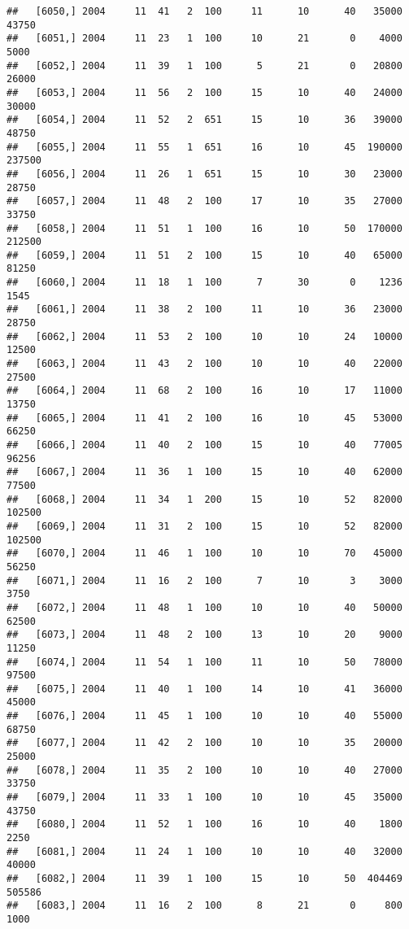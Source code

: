 \documentclass{article}\usepackage[]{graphicx}\usepackage[]{color}
\makeatletter
\newenvironment{kframe}{%
 \def\at@end@of@kframe{}%
 \ifinner\ifhmode%
  \def\at@end@of@kframe{\end{minipage}}%
  \begin{minipage}{\columnwidth}%
 \fi\fi%
 \def\FrameCommand##1{\hskip\@totalleftmargin \hskip-\fboxsep
 \colorbox{shadecolor}{##1}\hskip-\fboxsep
     \hskip-\linewidth \hskip-\@totalleftmargin \hskip\columnwidth}%
 \MakeFramed {\advance\hsize-\width
   \@totalleftmargin\z@ \linewidth\hsize
   \@setminipage}}%
 {\par\unskip\endMakeFramed%
 \at@end@of@kframe}
\newenvironment{knitrout}{}{} %
\makeatother
\begin{document}
\begin{knitrout}
\begin{kframe}
\begin{verbatim}
##   [6050,] 2004     11  41   2  100     11      10      40   35000   43750
##   [6051,] 2004     11  23   1  100     10      21       0    4000    5000
##   [6052,] 2004     11  39   1  100      5      21       0   20800   26000
##   [6053,] 2004     11  56   2  100     15      10      40   24000   30000
##   [6054,] 2004     11  52   2  651     15      10      36   39000   48750
##   [6055,] 2004     11  55   1  651     16      10      45  190000  237500
##   [6056,] 2004     11  26   1  651     15      10      30   23000   28750
##   [6057,] 2004     11  48   2  100     17      10      35   27000   33750
##   [6058,] 2004     11  51   1  100     16      10      50  170000  212500
##   [6059,] 2004     11  51   2  100     15      10      40   65000   81250
##   [6060,] 2004     11  18   1  100      7      30       0    1236    1545
##   [6061,] 2004     11  38   2  100     11      10      36   23000   28750
##   [6062,] 2004     11  53   2  100     10      10      24   10000   12500
##   [6063,] 2004     11  43   2  100     10      10      40   22000   27500
##   [6064,] 2004     11  68   2  100     16      10      17   11000   13750
##   [6065,] 2004     11  41   2  100     16      10      45   53000   66250
##   [6066,] 2004     11  40   2  100     15      10      40   77005   96256
##   [6067,] 2004     11  36   1  100     15      10      40   62000   77500
##   [6068,] 2004     11  34   1  200     15      10      52   82000  102500
##   [6069,] 2004     11  31   2  100     15      10      52   82000  102500
##   [6070,] 2004     11  46   1  100     10      10      70   45000   56250
##   [6071,] 2004     11  16   2  100      7      10       3    3000    3750
##   [6072,] 2004     11  48   1  100     10      10      40   50000   62500
##   [6073,] 2004     11  48   2  100     13      10      20    9000   11250
##   [6074,] 2004     11  54   1  100     11      10      50   78000   97500
##   [6075,] 2004     11  40   1  100     14      10      41   36000   45000
##   [6076,] 2004     11  45   1  100     10      10      40   55000   68750
##   [6077,] 2004     11  42   2  100     10      10      35   20000   25000
##   [6078,] 2004     11  35   2  100     10      10      40   27000   33750
##   [6079,] 2004     11  33   1  100     10      10      45   35000   43750
##   [6080,] 2004     11  52   1  100     16      10      40    1800    2250
##   [6081,] 2004     11  24   1  100     10      10      40   32000   40000
##   [6082,] 2004     11  39   1  100     15      10      50  404469  505586
##   [6083,] 2004     11  16   2  100      8      21       0     800    1000

\end{verbatim}
\end{kframe}
\end{knitrout}
\end{document}
